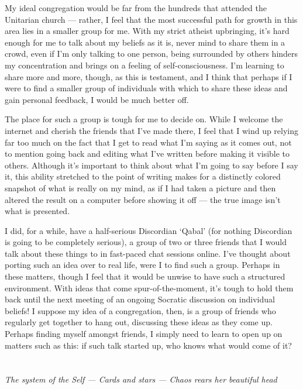 \documentclass{book}
\begin{document}
My ideal congregation would be far from the hundreds that attended the Unitarian church --- rather, I feel that the most successful path for growth in this area lies in a smaller group for me.  With my strict atheist upbringing, it's hard enough for me to talk about my beliefs as it is, never mind to share them in a crowd, even if I'm only talking to one person, being surrounded by others hinders my concentration and brings on a feeling of self-consciousness.  I'm learning to share more and more, though, as this is testament, and I think that perhaps if I were to find a smaller group of individuals with which to share these ideas and gain personal feedback, I would be much better off.

The place for such a group is tough for me to decide on.  While I welcome the internet and cherish the friends that I've made there, I feel that I wind up relying far too much on the fact that I get to read what I'm saying as it comes out, not to mention going back and editing what I've written before making it visible to others.  Although it's important to think about what I'm going to say before I say it, this ability stretched to the point of writing makes for a distinctly colored snapshot of what is really on my mind, as if I had taken a picture and then altered the result on a computer before showing it off --- the true image isn't what is presented.

I did, for a while, have a half-serious Discordian `Qabal' (for nothing Discordian is going to be completely serious), a group of two or three friends that I would talk about these things to in fast-paced chat sessions online.  I've thought about porting such an idea over to real life, were I to find such a group.  Perhaps in these matters, though I feel that it would be unwise to have such a structured environment.  With ideas that come spur-of-the-moment, it's tough to hold them back until the next meeting of an ongoing Socratic discussion on individual beliefs! I suppose my idea of a congregation, then, is a group of friends who regularly get together to hang out, discussing these ideas as they come up.  Perhaps finding myself amongst friends, I simply need to learn to open up on matters such as this: if such talk started up, who knows what would come of it?

\chapter{}
\begin{center}
	\emph{The system of the Self --- Cards and stars --- Chaos rears her beautiful head}
\end{center}
\end{document}
